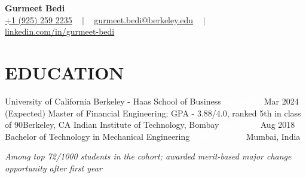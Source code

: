 


\begin{center}
{\Huge  \textbf{Gurmeet Bedi}} \\ \vspace{1pt}
\small
\href{tel:19252592235}{+1 (925) 259 2235} 
~ $\mid$ ~
\href{mailto:gurmeet.bedi@berkeley.edu}{ gurmeet.bedi@berkeley.edu} 
~ $\mid$ ~
\href{https://www.linkedin.com/in/gurmeet-bedi/}{linkedin.com/in/gurmeet-bedi} 
\\
\vspace{-8pt}
\end{center}


\section{EDUCATION}
  \resumeSubHeadingListStart
  \resumeSubheading
      {University of California Berkeley - Haas School of Business}{\textcolor{white}{Mar 2023 - }Mar 2024 (Expected)}
      {Master \textcolor{white}{}of Financial Engineering; GPA - 3.88/4.0, ranked 5th in class of 90}{Berkeley, CA}{}
    \resumeSubheading
      {Indian Institute of Technology, Bombay}{\textcolor{white}{Jun 2014 - }Aug 2018}
      {Bachelor of Technology in Mechanical Engineering \textcolor{white}{GPA - 7.33/10}}{Mumbai, India}{}
      
    \begin{itemize}[leftmargin=0.0in, label={}]
    \small{\textit{Among top 72/1000 students in the cohort; awarded merit-based major change opportunity after first year}}
    \vspace{-3pt}
    \end{itemize}
  \resumeSubHeadingListEnd

